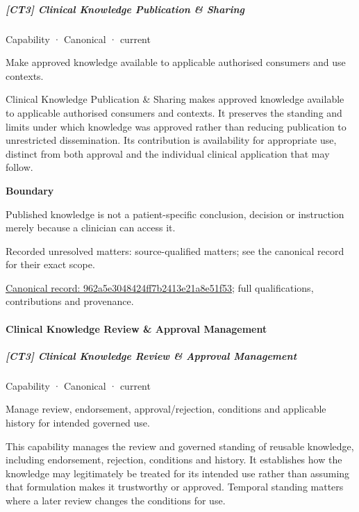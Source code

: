 \subparagraph{[CT3] Clinical Knowledge Publication \& Sharing}

\label{element:962a5e3048424ff7b2413e21a8e51f53}
{\small Capability · Canonical · current}\par

Make approved knowledge available to applicable authorised consumers and use contexts.



Clinical Knowledge Publication \& Sharing makes approved knowledge available to applicable authorised consumers and contexts. It preserves the standing and limits under which knowledge was approved rather than reducing publication to unrestricted dissemination. Its contribution is availability for appropriate use, distinct from both approval and the individual clinical application that may follow.



\textbf{Boundary}



Published knowledge is not a patient-specific conclusion, decision or instruction merely because a clinician can access it.


{\small Recorded unresolved matters: source-qualified matters; see the canonical record for their exact scope.}\par
{\footnotesize \href{../../../../continuum/strategy/capability/962a5e3048424ff7b2413e21a8e51f53.md}{Canonical record: 962a5e3048424ff7b2413e21a8e51f53}; full qualifications, contributions and provenance.}\par
\paragraph{Clinical Knowledge Review \& Approval Management}

\subparagraph{[CT3] Clinical Knowledge Review \& Approval Management}

\label{element:ee04d00077d548a7a0a2dffd424c3d78}
{\small Capability · Canonical · current}\par

Manage review, endorsement, approval/rejection, conditions and applicable history for intended governed use.



This capability manages the review and governed standing of reusable knowledge, including endorsement, rejection, conditions and history. It establishes how the knowledge may legitimately be treated for its intended use rather than assuming that formulation makes it trustworthy or approved. Temporal standing matters where a later review changes the conditions for use.



